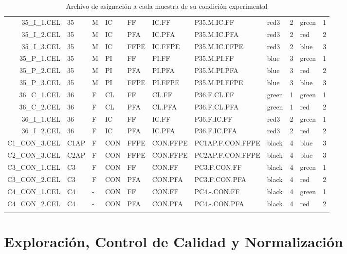 \documentclass[a4paper]{article}\usepackage[]{graphicx}\usepackage[]{color}
\begin{document}
{\begin{longtable}{rlllllllrlr}
  35\_I\_1.CEL & 35 & M & IC & FF & IC.FF & P35.M.IC.FF & red3 &   2 & green &   1 \\ 
  35\_I\_2.CEL & 35 & M & IC & PFA & IC.PFA & P35.M.IC.PFA & red3 &   2 & red &   2 \\ 
  35\_I\_3.CEL & 35 & M & IC & FFPE & IC.FFPE & P35.M.IC.FFPE & red3 &   2 & blue &   3 \\ 
  35\_P\_1.CEL & 35 & M & PI & FF & PI.FF & P35.M.PI.FF & blue &   3 & green &   1 \\ 
  35\_P\_2.CEL & 35 & M & PI & PFA & PI.PFA & P35.M.PI.PFA & blue &   3 & red &   2 \\ 
  35\_P\_3.CEL & 35 & M & PI & FFPE & PI.FFPE & P35.M.PI.FFPE & blue &   3 & blue &   3 \\ 
  36\_C\_1.CEL & 36 & F & CL & FF & CL.FF & P36.F.CL.FF & green &   1 & green &   1 \\ 
  36\_C\_2.CEL & 36 & F & CL & PFA & CL.PFA & P36.F.CL.PFA & green &   1 & red &   2 \\ 
  36\_I\_1.CEL & 36 & F & IC & FF & IC.FF & P36.F.IC.FF & red3 &   2 & green &   1 \\ 
  36\_I\_2.CEL & 36 & F & IC & PFA & IC.PFA & P36.F.IC.PFA & red3 &   2 & red &   2 \\ 
  C1\_CON\_3.CEL & C1AP & F & CON & FFPE & CON.FFPE & PC1AP.F.CON.FFPE & black &   4 & blue &   3 \\ 
  C2\_CON\_3.CEL & C2AP & F & CON & FFPE & CON.FFPE & PC2AP.F.CON.FFPE & black &   4 & blue &   3 \\ 
  C3\_CON\_1.CEL & C3 & F & CON & FF & CON.FF & PC3.F.CON.FF & black &   4 & green &   1 \\ 
  C3\_CON\_2.CEL & C3 & F & CON & PFA & CON.PFA & PC3.F.CON.PFA & black &   4 & red &   2 \\ 
  C4\_CON\_1.CEL & C4 & - & CON & FF & CON.FF & PC4.-.CON.FF & black &   4 & green &   1 \\ 
  C4\_CON\_2.CEL & C4 & - & CON & PFA & CON.PFA & PC4.-.CON.PFA & black &   4 & red &   2 \\ 
   \hline
\hline
\caption{Archivo de asignación a cada muestra de su condición experimental} 
\label{table.targets}
\end{longtable}

}
\normalsize




\section{Exploración, Control de Calidad y Normalización}
\end{document}
